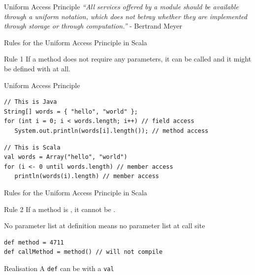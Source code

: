 \begin{frame}[fragile]{Uniform Access Principle}
\emph{``All services offered by a module should be available through a uniform
notation, which does not betray whether they are implemented through storage or
through computation.''} - Bertrand Meyer
\end{frame}

\begin{frame}[fragile]{Rules for the Uniform Access Principle in Scala}
\begin{block}{Rule 1}
If a method does not require any parameters, it can be called  and it might be defined with  at
all.
\end{block}
\pause
\begin{exampleblock}{Uniform Access Principle}
\begin{lstlisting}
// This is Java
String[] words = { "hello", "world" };
for (int i = 0; i < words.length; i++) // field access
   System.out.println(words[i].length()); // method access
\end{lstlisting}
\pause
\begin{lstlisting}
// This is Scala
val words = Array("hello", "world")
for (i <- 0 until words.length) // member access
   println(words(i).length) // member access
\end{lstlisting}
\end{exampleblock}
\end{frame}

\begin{frame}[fragile]{Rules for the Uniform Access Principle in Scala}
\begin{block}{Rule 2}
If a method is , it \alert{cannot}
be .
\end{block}
\pause
\begin{alertblock}{No parameter list at definition means no parameter list at
call site}
\begin{lstlisting}
def method = 4711
def callMethod = method() // will not compile
\end{lstlisting}
\end{alertblock}
\pause
\begin{block}{Realisation}
A \lstinline!def! can be  with a \lstinline!val!
\end{block}
\end{frame}

